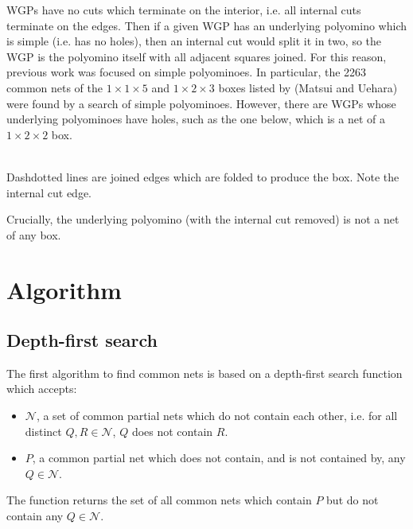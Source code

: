 \documentclass{article}
\begin{document}
WGPs have no cuts which terminate on the interior,
i.e. all internal cuts terminate on the edges.
Then if a given WGP has an underlying polyomino which is simple
(i.e. has no holes),
then an internal cut would split it in two,
so the WGP is the polyomino itself with all adjacent squares joined.
For this reason, previous work was focused on simple polyominoes.
In particular, the 2263 common nets
of the $1 \times 1 \times 5$ and $1 \times 2 \times 3$ boxes
listed by (Matsui and Uehara)
were found by a search of simple polyominoes.
However, there are WGPs whose underlying polyominoes have holes,
such as the one below, which is a net of a $1 \times 2 \times 2$ box.
\begin{center}
   \\
  Dashdotted lines are joined edges which are folded to produce the box.
  Note the internal cut edge.
\end{center}
Crucially, the underlying polyomino (with the internal cut removed)
is not a net of any box.

\section{Algorithm}
\subsection{Depth-first search}
The first algorithm to find common nets is based on
a depth-first search function which accepts:
\begin{itemize}
\item
  $\mathcal{N}$, a set of common partial nets which
  do not contain each other,
  i.e. for all distinct $Q, R \in \mathcal{N}$,
  $Q$ does not contain $R$.
\item
  $P$, a common partial net
  which does not contain, and is not contained by, any $Q \in \mathcal{N}$.
\end{itemize}
The function returns the set of all common nets
which contain $P$ but do not contain any $Q \in \mathcal{N}$.
\end{document}
